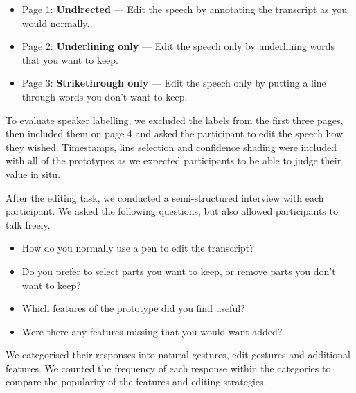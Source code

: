 
\begin{itemize}
  \item Page 1: \textbf{Undirected} --- Edit the speech by annotating the transcript as you would normally.
  \item Page 2: \textbf{Underlining only} --- Edit the speech only by underlining words that you want to keep.
  \item Page 3: \textbf{Strikethrough only} --- Edit the speech only by putting a line through words you don't
        want to keep.
\end{itemize}

To evaluate speaker labelling, we excluded the labels from the first three pages, then included them on page 4
and asked the participant to edit the speech how they wished.  Timestamps, line selection and confidence shading were
included with all of the prototypes as we expected participants to be able to judge their value in situ.

After the editing task, we conducted a semi-structured interview with each participant.
We asked the following questions, but also allowed participants to talk freely.

{\singlespacing
  \begin{itemize}
    \item How do you normally use a pen to edit the transcript?
    \item Do you prefer to select parts you want to keep, or remove parts you don't want to keep?
    \item Which features of the prototype did you find useful?
    \item Were there any features missing that you would want added?
  \end{itemize}
}

We categorised their responses into natural gestures, edit gestures and additional features. We counted the frequency
of each response within the categories to compare the popularity of the features and editing strategies.


